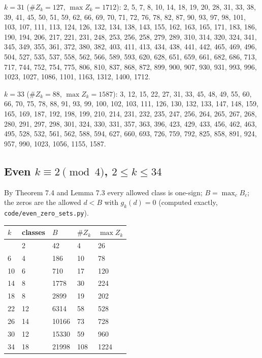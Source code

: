 \textbf{\(k=31\)} (\(\#Z_k=127\), \(\max Z_k=1712\)): 2, 5, 7, 8, 10, 14, 18, 19, 20, 28, 31, 33, 38, 39, 41, 45, 50, 51, 59, 62, 66, 69, 70, 71, 72, 76, 78, 82, 87, 90, 93, 97, 98, 101, 103, 107, 111, 113, 124, 126, 132, 134, 138, 143, 155, 162, 163, 165, 171, 183, 186, 190, 194, 206, 217, 221, 231, 248, 253, 256, 258, 279, 289, 310, 314, 320, 324, 341, 345, 349, 355, 361, 372, 380, 382, 403, 411, 413, 434, 438, 441, 442, 465, 469, 496, 504, 527, 535, 537, 558, 562, 566, 589, 593, 620, 628, 651, 659, 661, 682, 686, 713, 717, 744, 752, 754, 775, 806, 810, 837, 868, 872, 899, 900, 907, 930, 931, 993, 996, 1023, 1027, 1086, 1101, 1163, 1312, 1400, 1712.

\textbf{\(k=33\)} (\(\#Z_k=88\), \(\max Z_k=1587\)): 3, 12, 15, 22, 27, 31, 33, 45, 48, 49, 55, 60, 66, 70, 75, 78, 88, 91, 93, 99, 100, 102, 103, 111, 126, 130, 132, 133, 147, 148, 159, 165, 169, 187, 192, 198, 199, 210, 214, 231, 232, 235, 247, 256, 264, 265, 267, 268, 280, 291, 297, 298, 301, 324, 330, 331, 357, 363, 396, 423, 429, 433, 456, 462, 463, 495, 528, 532, 561, 562, 588, 594, 627, 660, 693, 726, 759, 792, 825, 858, 891, 924, 957, 990, 1023, 1056, 1155, 1587.

\subsection{\texorpdfstring{Even \(k\equiv2\pmod4\), \(2\le k\le34\)}{Even k\textbackslash equiv2\textbackslash pmod4, 2\textbackslash le k\textbackslash le34}}\label{even-kequiv2pmod4-2le-kle34}

By Theorem 7.4 and Lemma 7.3 every allowed class is one-sign; \(B=\max_cB_c\); the zeros are the allowed \(d<B\) with \(g_k(d)=0\) (computed exactly, \texttt{code/even\_zero\_sets.py}).

\begin{longtable}[]{@{}lllll@{}}
\toprule\noalign{}
\(k\) & classes & \(B\) & \(\#Z_k\) & \(\max Z_k\) \\
\midrule\noalign{}
\endhead
\bottomrule\noalign{}
\endlastfoot
2 & 2 & 42 & 4 & 26 \\
6 & 4 & 186 & 10 & 78 \\
10 & 6 & 710 & 17 & 120 \\
14 & 8 & 1778 & 30 & 224 \\
18 & 8 & 2899 & 19 & 202 \\
22 & 12 & 6314 & 58 & 528 \\
26 & 14 & 10166 & 73 & 728 \\
30 & 12 & 15330 & 59 & 960 \\
34 & 18 & 21998 & 108 & 1224 \\
\end{longtable}
